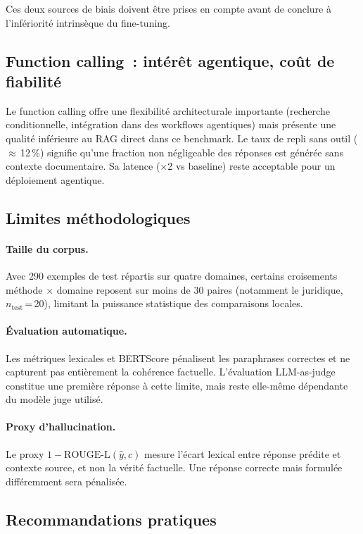 \documentclass[10pt,journal,compsoc]{IEEEtran}
\newcommand{\bs}{BERTScore}
\begin{document}
Ces deux sources de biais doivent être prises en compte avant de conclure à
l'infériorité intrinsèque du fine-tuning.

\subsection{Function calling~: intérêt agentique, coût de fiabilité}

Le function calling offre une flexibilité architecturale importante
(recherche conditionnelle, intégration dans des workflows agentiques)
mais présente une qualité inférieure au RAG direct dans ce benchmark.
Le taux de repli sans outil ($\approx$\,12\,\%) signifie qu'une fraction
non négligeable des réponses est générée sans contexte documentaire.
Sa latence ($\times$2 vs baseline) reste acceptable pour un déploiement
agentique.

\subsection{Limites méthodologiques}
\label{subsec:limites}

\paragraph{Taille du corpus.}
Avec 290 exemples de test répartis sur quatre domaines, certains
croisements méthode $\times$ domaine reposent sur moins de 30 paires
(notamment le juridique, $n_\text{test}$\,=\,20), limitant la puissance
statistique des comparaisons locales.

\paragraph{Évaluation automatique.}
Les métriques lexicales et \bs{} pénalisent les paraphrases correctes
et ne capturent pas entièrement la cohérence factuelle. L'évaluation
LLM-as-judge constitue une première réponse à cette limite, mais reste
elle-même dépendante du modèle juge utilisé.

\paragraph{Proxy d'hallucination.}
Le proxy $1 - \text{ROUGE-L}(\hat{y}, c)$ mesure l'écart lexical
entre réponse prédite et contexte source, et non la vérité factuelle.
Une réponse correcte mais formulée différemment sera pénalisée.

\subsection{Recommandations pratiques}
\end{document}
